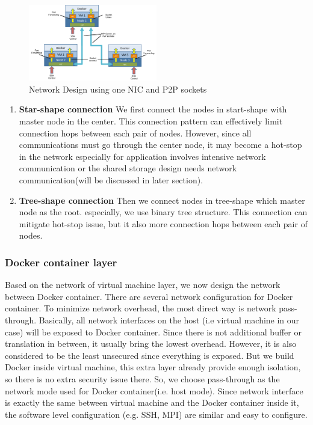 \begin{figure}[h]
    \centering
    \caption{Network Design using one NIC and P2P sockets}
    \label{p2p}
    \includegraphics[width=0.5\textwidth]{figures/p2p.pdf}
\end{figure}

\begin{enumerate}
\item \textbf{Star-shape connection}
We first connect the nodes in start-shape with master node in the center. This connection pattern can effectively limit connection hops between each pair of nodes. However, since all communications must go through the center node, it may become a hot-stop in the network especially for application involves intensive network communication or the shared storage design needs network communication(will be discussed in later section).
\item \textbf{Tree-shape connection}
Then we connect nodes in tree-shape which master node as the root. especially, we use binary tree structure. This connection can mitigate hot-stop issue, but it also more connection hops between each pair of nodes.
\end{enumerate}

\subsubsection{Docker container layer}
Based on the network of virtual machine layer, we now design the network between Docker container. There are several network configuration for Docker container. To minimize network overhead, the most direct way is network pass-through. Basically, all network interfaces on the host (i.e virtual machine in our case) will be exposed to Docker container. Since there is not additional buffer or translation in between, it usually bring the lowest overhead. However, it is also considered to be the least unsecured since everything is exposed. But we build Docker inside virtual machine, this extra layer already provide enough isolation, so there is no extra security issue there. So, we choose pass-through as the network mode used for Docker container(i.e. host mode). Since network interface is exactly the same between virtual machine and the Docker container inside it, the software level configuration (e.g. SSH, MPI) are similar and easy to configure.

